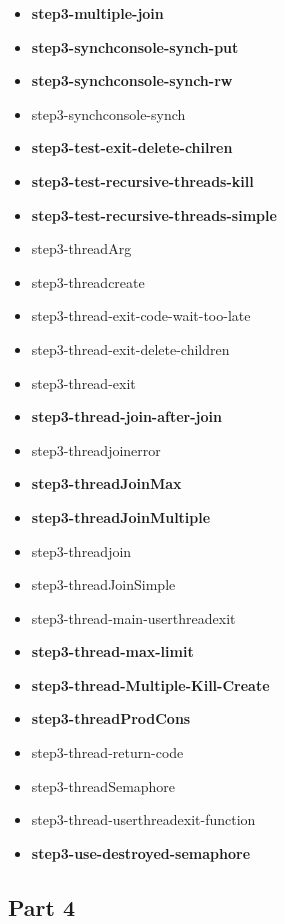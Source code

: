 \documentclass[a4paper,10pt]{article}
\begin{document}
\begin{itemize}
\item {\bf step3-multiple-join}
\item {\bf step3-synchconsole-synch-put}
\item {\bf step3-synchconsole-synch-rw}
\item step3-synchconsole-synch
\item {\bf step3-test-exit-delete-chilren}
\item {\bf step3-test-recursive-threads-kill}
\item {\bf step3-test-recursive-threads-simple}
\item step3-threadArg
\item step3-threadcreate
\item step3-thread-exit-code-wait-too-late
\item step3-thread-exit-delete-children
\item step3-thread-exit
\item {\bf step3-thread-join-after-join}
\item step3-threadjoinerror
\item {\bf step3-threadJoinMax}
\item {\bf step3-threadJoinMultiple}
\item step3-threadjoin
\item step3-threadJoinSimple
\item step3-thread-main-userthreadexit
\item {\bf step3-thread-max-limit}
\item {\bf step3-thread-Multiple-Kill-Create}
\item {\bf step3-threadProdCons}
\item step3-thread-return-code
\item step3-threadSemaphore
\item step3-thread-userthreadexit-function
\item {\bf step3-use-destroyed-semaphore}
\end{itemize} 

\subsection{Part 4}
\end{document}

